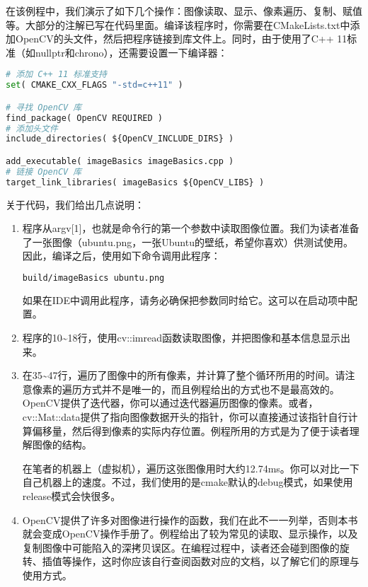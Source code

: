 在该例程中，我们演示了如下几个操作：图像读取、显示、像素遍历、复制、赋值等。大部分的注解已写在代码里面。编译该程序时，你需要在CMakeLists.txt中添加OpenCV的头文件，然后把程序链接到库文件上。同时，由于使用了C++ 11标准（如nullptr和chrono），还需要设置一下编译器：

\begin{lstlisting}[language=Python,caption=slambook/ch5/imageBasics/CMakeLists.txt]
# 添加 C++ 11 标准支持
set( CMAKE_CXX_FLAGS "-std=c++11" )

# 寻找 OpenCV 库
find_package( OpenCV REQUIRED )
# 添加头文件
include_directories( ${OpenCV_INCLUDE_DIRS} )

add_executable( imageBasics imageBasics.cpp )
# 链接 OpenCV 库
target_link_libraries( imageBasics ${OpenCV_LIBS} )
\end{lstlisting}

关于代码，我们给出几点说明：
\begin{enumerate}
	\item 程序从argv[1]，也就是命令行的第一个参数中读取图像位置。我们为读者准备了一张图像（ubuntu.png，一张Ubuntu的壁纸，希望你喜欢）供测试使用。因此，编译之后，使用如下命令调用此程序：
\begin{lstlisting}[language=sh,caption=终端输入：]
build/imageBasics ubuntu.png
\end{lstlisting}
	如果在IDE中调用此程序，请务必确保把参数同时给它。这可以在启动项中配置。
	\item 程序的10\textasciitilde18行，使用cv::imread函数读取图像，并把图像和基本信息显示\mbox{出来。}
	\item 在35\textasciitilde47行，遍历了图像中的所有像素，并计算了整个循环所用的时间。请注意像素的遍历方式并不是唯一的，而且例程给出的方式也不是最高效的。OpenCV提供了迭代器，你可以通过迭代器遍历图像的像素。或者，cv::Mat::data提供了指向图像数据开头的指针，你可以直接通过该指针自行计算偏移量，然后得到像素的实际内存位置。例程所用的方式是为了便于读者理解图像的结构。

	在笔者的机器上（虚拟机），遍历这张图像用时大约12.74ms。你可以对比一下自己机器上的速度。不过，我们使用的是cmake默认的debug模式，如果使用release模式会快很多。

	\item OpenCV提供了许多对图像进行操作的函数，我们在此不一一列举，否则本书就会变成OpenCV操作手册了。例程给出了较为常见的读取、显示操作，以及复制图像中可能陷入的深拷贝误区。在编程过程中，读者还会碰到图像的旋转、插值等操作，这时你应该自行查阅函数对应的文档，以了解它们的原理与使用方式。
\end{enumerate}

